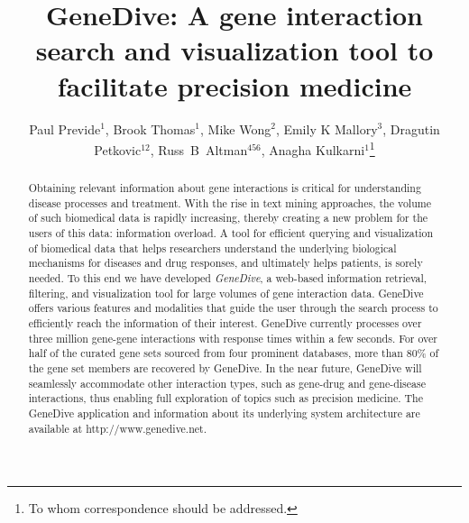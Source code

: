 \documentclass{ws-procs11x85}
\begin{document}
\title{GeneDive: A gene interaction search and visualization tool to facilitate precision medicine}

\author{Paul Previde$^1$, Brook Thomas$^1$, Mike Wong$^2$, Emily K Mallory$^3$, Dragutin Petkovic$^{12}$, Russ~B~Altman$^{456}$, Anagha Kulkarni$^1$\footnote{To whom correspondence should be addressed.} \linebreak} 


\address{$^1$Department of Computer Science\\
$^2$Center for Computing for Life Sciences\\
San Francisco State University\\
San Francisco, California 94132, U.S.A. \\
E-mail: \{pprevide,bthomas\}@mail.sfsu.edu, \{mikewong, petkovic, ak\}@sfsu.edu}%

\address{$^3$Biomedical Informatics Training Program\\
$^4$Department of Bioengineering,\\
$^5$Department of Genetics,\\
$^6$School of Medicine,\\
Stanford University,\\
Stanford, California 94305, U.S.A. \\
E-mail: \{emily.mallory,russ.altman\}@stanford.edu}

\begin{abstract}
Obtaining relevant information about gene interactions is critical for understanding disease processes and treatment. With the rise in text mining approaches, the volume of such biomedical data is rapidly increasing, thereby creating a new problem for the users of this data: information overload. A tool for efficient querying and visualization of biomedical data that helps researchers understand the underlying biological mechanisms for diseases and drug responses, and ultimately helps patients, is sorely needed. To this end we have developed \emph{GeneDive}, a web-based information retrieval, filtering, and visualization tool for large volumes of gene interaction data. GeneDive offers various features and modalities that guide the user through the search process to efficiently reach the information of their interest. GeneDive currently processes over three million gene-gene interactions with response times within a few seconds.  For over half of the curated gene sets sourced from four prominent databases, more than 80\% of the gene set members are recovered by GeneDive.  In the near future, GeneDive will seamlessly accommodate other interaction types, such as gene-drug and gene-disease interactions, thus enabling full exploration of topics such as precision medicine. The GeneDive application and information about its underlying system architecture are available at http://www.genedive.net. 
\end{abstract}
\end{document}
